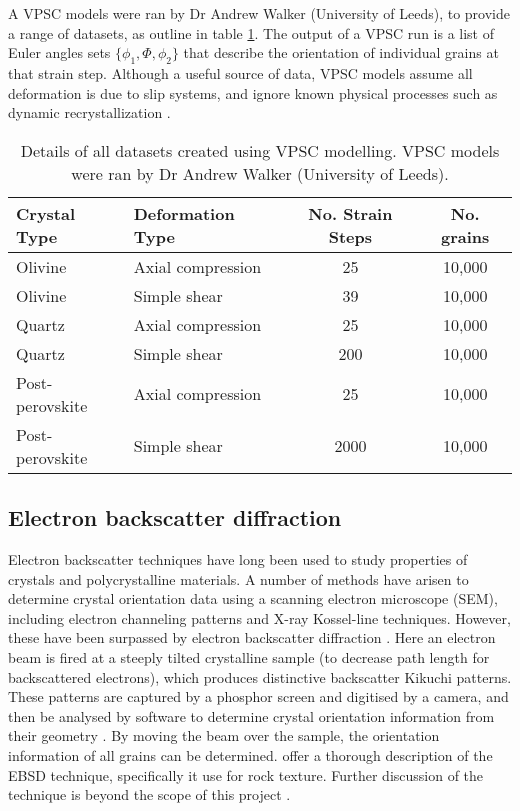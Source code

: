 \documentclass[a4paper,12pt,twoside]{report}
\numberwithin{equation}{chapter}
\begin{document}
A VPSC models were ran by Dr Andrew Walker (University of Leeds), to provide a range of datasets, as outline in table \ref{tab:VPSC_data}. The output of a VPSC run is a list of Euler angles sets $\{\phi_1,\Phi,\phi_2\}$ that describe the orientation of individual grains at that strain step. Although a useful source of data, VPSC models assume all deformation is due to slip systems, and ignore known physical processes such as dynamic recrystallization \citep[see,][]{Stipp2002}.      

\begin{table} 
	\centering
	\caption[VPSC datasets]{Details of all datasets created using VPSC modelling. VPSC models were ran by Dr Andrew Walker (University of Leeds).\\}
\begin{tabularx}{\textwidth}{X X c c}
	\hline
	\hline
	Crystal Type    & Deformation Type  & No. Strain Steps & No. grains \\
	\hline
	\hline
	Olivine         & Axial compression & 25   & 10,000 \\
	Olivine         & Simple shear      & 39   & 10,000 \\
	Quartz          & Axial compression & 25   & 10,000 \\
	Quartz          & Simple shear      & 200  & 10,000 \\
	Post-perovskite & Axial compression & 25   & 10,000 \\
	Post-perovskite & Simple shear      & 2000 & 10,000 \\
	\hline
	\end{tabularx}
\label{tab:VPSC_data}
\end{table}

\subsection{Electron backscatter diffraction}
    
    
Electron backscatter techniques have long been used to study properties of crystals and polycrystalline materials. A number of methods have arisen to determine crystal orientation data using a scanning electron microscope (SEM), including electron channeling patterns and X-ray Kossel-line techniques. However, these have been surpassed by electron backscatter diffraction \citep[EBSD or backscatter Kikuchi diffraction,][]{Harland1973}.  Here an electron beam is fired at a steeply tilted crystalline sample (to decrease path length for backscattered electrons), which produces distinctive backscatter Kikuchi patterns. These patterns are captured by a phosphor screen and digitised by a camera, and then be analysed by software to determine crystal orientation information from their geometry  \citep{Zaefferer2007}. By moving the beam over the sample, the orientation information of all grains can be determined. \cite{Prior1999} offer a thorough description of the EBSD technique, specifically it use for rock texture. Further discussion of the technique is beyond the scope of this project \citep[see][for more info]{Schwarzer1997,Randle2000}.  
\end{document}
